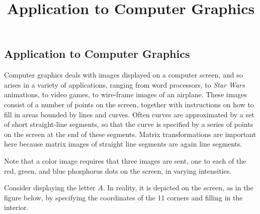 \documentclass{ximera}
\title{Application to Computer Graphics} \license{CC BY-NC-SA 4.0}
\begin{document}
\begin{abstract}
\end{abstract}
\maketitle

\begin{onlineOnly}
\section*{Application to Computer Graphics}
\end{onlineOnly}

Computer graphics deals with images
displayed on a computer screen, and so arises in a variety of
applications, ranging from word processors, to \textit{Star Wars}
animations, to video games, to wire-frame images of an airplane.  These
images consist of a number of points on the screen, together with
instructions on how to fill in areas bounded by lines and curves. Often
curves are approximated by a set of short straight-line segments, so
that the curve is specified by a series of points on the screen at the
end of these segments. Matrix transformations are important here because
 matrix images of straight line segments are again line segments.
 
 Note that a color image requires that three images are sent, one to
each of the red, green, and blue phosphorus dots on the screen, in
varying intensities.

Consider displaying the letter $A$. In reality, it is depicted on the screen, as in the figure below, by specifying the coordinates of the 11 corners and filling in the interior.
\end{document}
